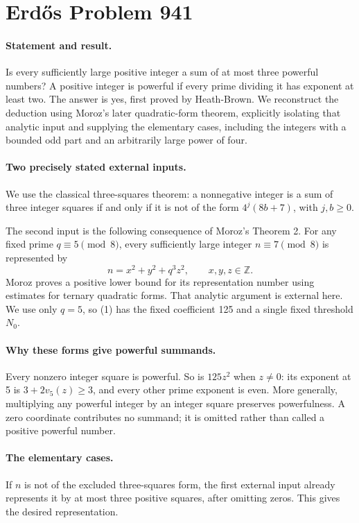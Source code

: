 \section*{Erd\H{o}s Problem 941}

\paragraph{Statement and result.}
Is every sufficiently large positive integer a sum of at most three powerful numbers? A positive integer is powerful if every prime dividing it has exponent at least two. The answer is yes, first proved by Heath-Brown. We reconstruct the deduction using Moroz's later quadratic-form theorem, explicitly isolating that analytic input and supplying the elementary cases, including the integers with a bounded odd part and an arbitrarily large power of four.

\paragraph{Two precisely stated external inputs.}
We use the classical three-squares theorem: a nonnegative integer is a sum of three integer squares if and only if it is not of the form \(4^j(8b+7)\), with \(j,b\geq0\).

The second input is the following consequence of Moroz's Theorem 2. For any fixed prime \(q\equiv5\pmod8\), every sufficiently large integer \(n\equiv7\pmod8\) is represented by
\[
 n=x^2+y^2+q^3z^2,\qquad x,y,z\in\mathbb Z. \tag{1}
\]
Moroz proves a positive lower bound for its representation number using estimates for ternary quadratic forms. That analytic argument is external here. We use only \(q=5\), so (1) has the fixed coefficient 125 and a single fixed threshold \(N_0\).

\paragraph{Why these forms give powerful summands.}
Every nonzero integer square is powerful. So is \(125z^2\) when \(z\ne0\): its exponent at 5 is \(3+2v_5(z)\geq3\), and every other prime exponent is even. More generally, multiplying any powerful integer by an integer square preserves powerfulness. A zero coordinate contributes no summand; it is omitted rather than called a positive powerful number.

\paragraph{The elementary cases.}
If \(n\) is not of the excluded three-squares form, the first external input already represents it by at most three positive squares, after omitting zeros. This gives the desired representation.

